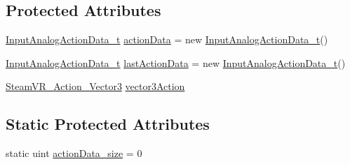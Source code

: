 \subsection*{Protected Attributes}
\begin{DoxyCompactItemize}
\item 
\mbox{\hyperlink{struct_valve_1_1_v_r_1_1_input_analog_action_data__t}{Input\+Analog\+Action\+Data\+\_\+t}} \mbox{\hyperlink{class_valve_1_1_v_r_1_1_steam_v_r___action___vector3___source_a96904099dcc5be6ebf7082294b82cc16}{action\+Data}} = new \mbox{\hyperlink{struct_valve_1_1_v_r_1_1_input_analog_action_data__t}{Input\+Analog\+Action\+Data\+\_\+t}}()
\item 
\mbox{\hyperlink{struct_valve_1_1_v_r_1_1_input_analog_action_data__t}{Input\+Analog\+Action\+Data\+\_\+t}} \mbox{\hyperlink{class_valve_1_1_v_r_1_1_steam_v_r___action___vector3___source_af27018c0c1e75a7f749be6fb92172aa3}{last\+Action\+Data}} = new \mbox{\hyperlink{struct_valve_1_1_v_r_1_1_input_analog_action_data__t}{Input\+Analog\+Action\+Data\+\_\+t}}()
\item 
\mbox{\hyperlink{class_valve_1_1_v_r_1_1_steam_v_r___action___vector3}{Steam\+V\+R\+\_\+\+Action\+\_\+\+Vector3}} \mbox{\hyperlink{class_valve_1_1_v_r_1_1_steam_v_r___action___vector3___source_a9a1d14654883032a457b2d0f3795be4f}{vector3\+Action}}
\end{DoxyCompactItemize}
\subsection*{Static Protected Attributes}
\begin{DoxyCompactItemize}
\item 
static uint \mbox{\hyperlink{class_valve_1_1_v_r_1_1_steam_v_r___action___vector3___source_a5aebd3392aec1a1b1afff3e507f2cf35}{action\+Data\+\_\+size}} = 0
\end{DoxyCompactItemize}
